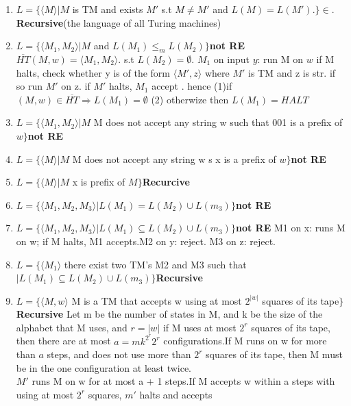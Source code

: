 \documentclass[10pt,landscape]{article}
\theoremstyle{plain}%
\theoremstyle{definition}
\theoremstyle{remark}
\begin{document}
\begin{multicols}{3}
\begin{enumerate}
\item $ L=\{ \langle M \rangle |M$ is TM and exists $M'$ s.t $M\ne M'$ and $L(M)= L(M') .\}\in.$\textbf{Recursive}(the language of all Turing machines)
\item $ L=\{ \langle M_1,M_2 \rangle |M$ and  $L(M_1)\le_m L(M_2)\}$\textbf{not RE} $\overline{HT}(M,w)=\langle M_1,M_2\rangle.$ s.t $L(M_2)=\emptyset$. $M_1$ on input $y$: run M on $w$ if M halts, check whether y is of the form $\langle M' ,z\rangle $ where $M'$ is TM and z is str. if so run $M'$ on z. if $M'$ halts, $M_1 $ accept . hence (1)if  $(M,w)\in \overline{HT} \Rightarrow L(M_1)=\emptyset$ (2) otherwize then $L(M_1)=HALT$
\item $ L=\{ \langle M_1,M_2 \rangle |M$ M does not accept any string w such that 001 is a prefix of $w\}$\textbf{not RE}
\item $ L=\{ \langle M \rangle |M$ M does not accept any string w s x is a prefix of  $w\}$\textbf{not RE}
\item $ L=\{ \langle M \rangle |M$ x is prefix of $M \}$\textbf{Recurcive}
\item $ L=\{ \langle M_1,M_2,M_3 \rangle |L(M_1)=L(M_2)\cup L(m_3) \}$\textbf{not RE}
\item $ L=\{ \langle M_1,M_2,M_3 \rangle |L(M_1)\subseteq L(M_2)\cup L(m_3) \}$\textbf{not RE}
M1 on x: runs M on w; if M halts, M1 accepts.M2 on y: reject.
M3 on z: reject.
\item $ L=\{ \langle M_1 \rangle $ there exist two TM’s M2 and M3 such that $|L(M_1)\subseteq L(M_2)\cup L(m_3) \}$\textbf{Recursive}
\item $ L=\{ \langle M,w \rangle $ M is a TM that accepts w using at most $2^
|w|$
squares of its tape$\}$\textbf{Recursive}
Let m be the number of states in M, and k be the size of the alphabet that
M uses, and $r=|w|$ if M uses at most $2^r$ 
squares of its tape, then there are at most $a=mk^{2^r}2^r$ configurations.If M runs on w for more than $a$ steps, and does not
use more than $2^r$
squares of its tape, then M must be in the one configuration at least twice.\\ $M'$
runs M on w for at most a + 1 steps.If M accepts w within a steps with using at most $2^r$
squares, $m'$ halts and accepts
\end{enumerate}


\setlength{\premulticols}{1pt}
\setlength{\postmulticols}{1pt}
\setlength{\multicolsep}{1pt}
\setlength{\columnsep}{2pt}

\end{multicols}
\end{document}

